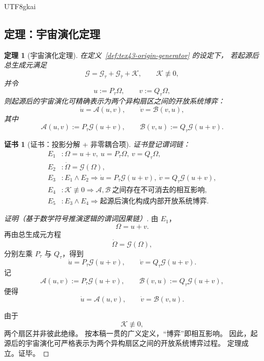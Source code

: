 \documentclass[12pt]{article}
\newtheorem{theorem}{定理}[section]
\newtheorem{Certificate}{证书}[section]
\begin{document}
\begin{CJK*}{UTF8}{gkai}
\subsection{定理：宇宙演化定理}
\label{subsec:tex43-ch4-theorem-evolution}

\begin{theorem}[宇宙演化定理]
\label{thm:tex43-origin-evolution}
在定义~\ref{def:tex43-origin-generator} 的设定下，
若起源后总生成元满足
\[
  \mathcal G
  =
  \mathcal G_\tau+\mathcal G_{\bar\tau}+\mathcal K,
  \qquad
  \mathcal K\not\equiv 0,
\]
并令
\[
  u:=P_\tau\Omega,
  \qquad
  v:=Q_\tau\Omega,
\]
则起源后的宇宙演化可精确表示为两个异构扇区之间的开放系统博弈：
\[
  \dot u=\mathcal A(u,v),
  \qquad
  \dot v=\mathcal B(v,u),
\]
其中
\[
  \mathcal A(u,v):=P_\tau\mathcal G(u+v),
  \qquad
  \mathcal B(v,u):=Q_\tau\mathcal G(u+v).
\]
\end{theorem}

\begin{Certificate}[证书：投影分解 + 非零耦合项]
\label{cert:tex43-origin-evolution}
证书登记谓词链：
\[
\begin{aligned}
  E_1 &: \Omega=u+v,\ u=P_\tau\Omega,\ v=Q_\tau\Omega,\\
  E_2 &: \dot\Omega=\mathcal G(\Omega),\\
  E_3 &: E_1\wedge E_2 \Rightarrow \dot u=P_\tau\mathcal G(u+v),\ \dot v=Q_\tau\mathcal G(u+v),\\
  E_4 &: \mathcal K\not\equiv 0 \Rightarrow \mathcal A,\mathcal B\ \text{之间存在不可消去的相互影响},\\
  E_5 &: E_3\wedge E_4 \Rightarrow \text{起源后演化构成内部开放系统博弈}.
\end{aligned}
\]
\end{Certificate}

\begin{proof}[证明（基于数学符号推演逻辑的谓词因果链）]
由 $E_1$，
\[
  \Omega=u+v.
\]
再由总生成元方程
\[
  \dot\Omega=\mathcal G(\Omega),
\]
分别左乘 $P_\tau$ 与 $Q_\tau$，得到
\[
  \dot u=P_\tau\mathcal G(u+v),
  \qquad
  \dot v=Q_\tau\mathcal G(u+v).
\]
记
\[
  \mathcal A(u,v):=P_\tau\mathcal G(u+v),
  \qquad
  \mathcal B(v,u):=Q_\tau\mathcal G(u+v),
\]
便得
\[
  \dot u=\mathcal A(u,v),
  \qquad
  \dot v=\mathcal B(v,u).
\]

由于
\[
  \mathcal K\not\equiv 0,
\]
两个扇区并非彼此绝缘。
按本稿一贯的广义定义，“博弈”即相互影响。
因此，起源后的宇宙演化可严格表示为两个异构扇区之间的开放系统博弈过程。
定理成立。证毕。
\end{proof}


\end{CJK*}
\end{document}
